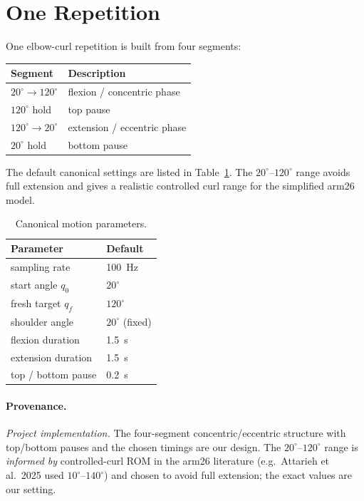 \documentclass[11pt]{article}
\newcommand{\dg}{^{\circ}}
\begin{document}
\section{One Repetition}

One elbow-curl repetition is built from four segments:
\begin{center}
\begin{tabular}{ll}
\toprule
\textbf{Segment} & \textbf{Description} \\
\midrule
$20\dg \rightarrow 120\dg$ & flexion / concentric phase \\
$120\dg$ hold & top pause \\
$120\dg \rightarrow 20\dg$ & extension / eccentric phase \\
$20\dg$ hold & bottom pause \\
\bottomrule
\end{tabular}
\end{center}

The default canonical settings are listed in Table~\ref{tab:params}. The
$20\dg$--$120\dg$ range avoids full extension and gives a realistic
controlled curl range for the simplified arm26 model.

\begin{table}[h]
\centering
\begin{tabular}{ll}
\toprule
\textbf{Parameter} & \textbf{Default} \\
\midrule
sampling rate & \SI{100}{\hertz} \\
start angle $q_0$ & $20\dg$ \\
fresh target $q_f$ & $120\dg$ \\
shoulder angle & $20\dg$ (fixed) \\
flexion duration & \SI{1.5}{\second} \\
extension duration & \SI{1.5}{\second} \\
top / bottom pause & \SI{0.2}{\second} \\
\bottomrule
\end{tabular}
\caption{Canonical motion parameters.}
\label{tab:params}
\end{table}

\paragraph{Provenance.} \textit{Project implementation.} The four-segment
concentric/eccentric structure with top/bottom pauses and the chosen timings are
our design. The $20\dg$--$120\dg$ range is \textit{informed by} controlled-curl
ROM in the arm26 literature (e.g.\ Attarieh et al.\ 2025 used $10\dg$--$140\dg$)
and chosen to avoid full extension; the exact values are our setting.
\end{document}
